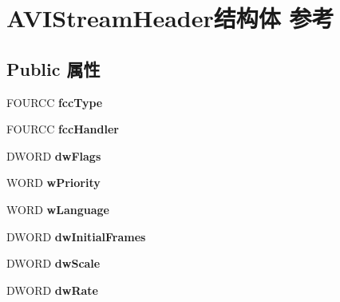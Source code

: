 \hypertarget{struct_a_v_i_stream_header}{}\section{A\+V\+I\+Stream\+Header结构体 参考}
\label{struct_a_v_i_stream_header}
\subsection*{Public 属性}
\begin{DoxyCompactItemize}
\item 
\mbox{\label{struct_a_v_i_stream_header_a4bba19fbbb275a38cb453ec2ff083208}} 
F\+O\+U\+R\+CC {\bfseries fcc\+Type}
\item 
\mbox{\label{struct_a_v_i_stream_header_a41b36ef6d9062c03342155db5ce5174e}} 
F\+O\+U\+R\+CC {\bfseries fcc\+Handler}
\item 
\mbox{\label{struct_a_v_i_stream_header_a54c62294543ada7371e45727528f00dc}} 
D\+W\+O\+RD {\bfseries dw\+Flags}
\item 
\mbox{\label{struct_a_v_i_stream_header_ae1fdc8fdd558c775b3163423ff6c47ae}} 
W\+O\+RD {\bfseries w\+Priority}
\item 
\mbox{\label{struct_a_v_i_stream_header_a38ca12b26b855506a49a771a1b325e77}} 
W\+O\+RD {\bfseries w\+Language}
\item 
\mbox{\label{struct_a_v_i_stream_header_a09f652d9a0e6a419179593fb8a816145}} 
D\+W\+O\+RD {\bfseries dw\+Initial\+Frames}
\item 
\mbox{\label{struct_a_v_i_stream_header_a44c10c450c01e2768d472a1a1d879a80}} 
D\+W\+O\+RD {\bfseries dw\+Scale}
\item 
\mbox{\label{struct_a_v_i_stream_header_acc3753f4f8f21987a52c8023491a1e4d}} 
D\+W\+O\+RD {\bfseries dw\+Rate}
\item 
\mbox{\label{struct_a_v_i_stream_header_a1bcea61456f8e0aca810c488afa3cb47}} 

\end{DoxyCompactItemize}
